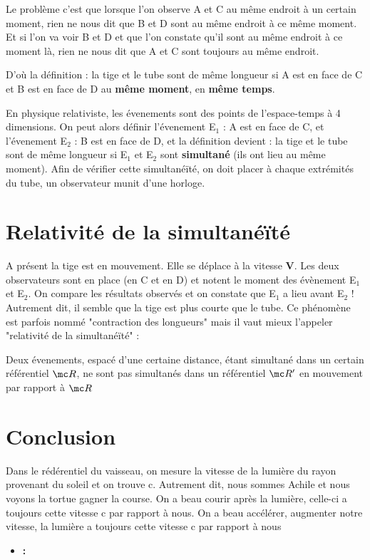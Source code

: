 
Le problème c'est que lorsque l'on observe A et C au même endroit à un certain moment, rien ne nous dit que B et D sont au même endroit à ce même moment. Et si l'on va voir B et D et que l'on constate qu'il sont au même endroit à ce moment là, rien ne nous dit que A et C sont toujours au même endroit.

D'où la définition : la tige et le tube sont de même longueur si A est en face de C et B est en face de D au {\bf même moment}, en {\bf même temps}.

En physique relativiste, les évenements sont des points de l'espace-temps à 4 dimensions.
On peut alors définir l'évenement E$_1$ : A est en face de C, et l'évenement E$_2$ : B est en face de D, et la définition devient : la tige et le tube sont de même longueur si E$_1$ et E$_2$ sont {\bf simultané} (ils ont lieu au même moment). Afin de vérifier cette simultanéïté, on doit placer à chaque extrémités du tube, un observateur munit d'une horloge.

\section{Relativité de la simultanéïté}

A présent la tige est en mouvement. Elle se déplace à la vitesse {\bf V}. Les deux observateurs sont en place (en C et en D) et notent le moment des évènement E$_1$ et E$_2$. On compare les résultats observés et on constate que E$_1$ a lieu avant E$_2$ ! Autrement dit, il semble que la tige est plus courte que le tube. Ce phénomène est parfois nommé "contraction des longueurs" mais il vaut mieux l'appeler "relativité de la simultanéïté" : 
\begin{center}
Deux évenements, espacé d'une certaine distance, étant simultané dans un certain référentiel ${\mc R}$, ne sont pas simultanés dans un référentiel ${\mc R'}$ en mouvement par rapport à ${\mc R}$
\end{center}


\subsection{}
\subsection{}
\section{Conclusion}
Dans le rédérentiel du vaisseau, on mesure la vitesse de la lumière du rayon provenant du soleil et on trouve c.
Autrement dit, nous sommes Achile et nous voyons la tortue gagner la course. On a beau courir après la lumière, celle-ci a toujours cette vitesse c par rapport à nous. On a beau accélérer, augmenter notre vitesse, la lumière a toujours cette vitesse c par rapport à nous

\begin{itemize}[leftmargin=1cm, label=, itemsep=1pt]
\item {\bf :}
\end{itemize}

